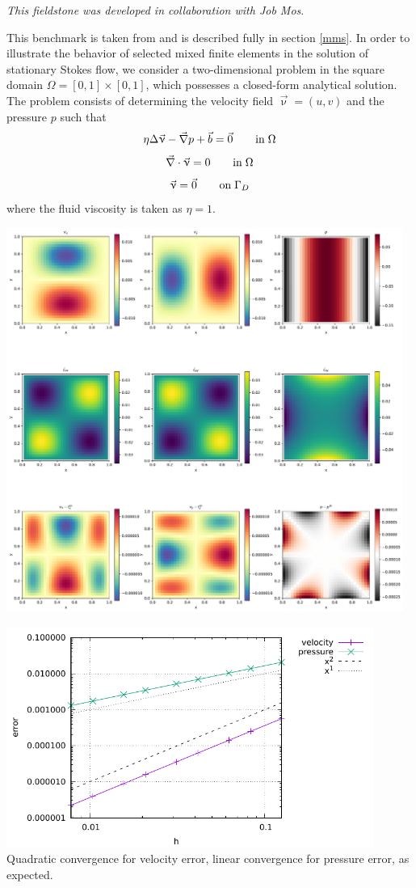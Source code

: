 

{\sl This fieldstone was developed in collaboration with Job Mos}.

This benchmark is taken from \cite{dohu03} and is described fully in section \ref{mms}. 
In order to illustrate the behavior of selected mixed finite elements in the solution 
of stationary Stokes flow,  we consider a two-dimensional problem 
in the square domain $\Omega=[0,1]\times[0,1]$, which possesses a closed-form analytical 
solution. The problem consists of determining the velocity field $\vec{\upnu} = (u,v)$ and the 
pressure $p$ such that 
\[
\eta \Delta \vec\upnu - \vec{\nabla} p + \vec{b} = \vec{0}   \quad\quad {\rm in} \; \Omega
\]
\[
\vec{\nabla} \cdot \vec{\upnu} = 0 \quad\quad {\rm in} \; \Omega
\]
\[
\vec{\upnu}=\vec{0} \quad\quad {\rm on} \; \Gamma_D
\]
where the fluid viscosity is taken as $\eta=1$. 

\begin{center}
\includegraphics[width=13cm]{python_codes/fieldstone_01/solution.pdf}
\end{center}

\begin{center}
\includegraphics[width=12cm]{python_codes/fieldstone_01/errors.pdf}\\
{\captionfont Quadratic convergence for velocity error, 
linear convergence for pressure error, as expected.}
\end{center}

